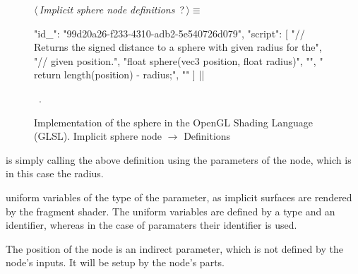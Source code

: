 \documentclass[%
    a4paper,    %
    justified,  %
    nobib,      %
    openany     %
]{tufte-book}
\makeatletter
\renewcommand{\label}[1]{\@tufte@label{##1}}%
\makeatother
\begin{document}
\begin{figure}
\begin{flushleft} \small
\begin{minipage}{\linewidth}\label{scrap102}\raggedright\small
{} $\langle\,${\itshape Implicit sphere node definitions}\nobreak\ {\footnotesize {?}}$\,\rangle\equiv$
\vspace{-1ex}
\begin{pythoncode}
{
    "id_": "99d20a26-f233-4310-adb2-5e540726d079",
    "script": [
        "// Returns the signed distance to a sphere with given radius for the",
        "// given position.",
        "float sphere(vec3 position, float radius)",
        "{",
        "    return length(position) - radius;",
        "}"
    ]
}|\NWsep|
\end{pythoncode}
\vspace{1.5ex}
\footnotesize
\begin{list}{}{\setlength{\itemsep}{-\parsep}\setlength{\itemindent}{-\leftmargin}}
\item \NWtxtMacroRefIn\ .

\item{}
\end{list}
\end{minipage}\vspace{4ex}
\end{flushleft}
\caption{Implementation of the sphere in the OpenGL Shading Language (GLSL).
  \newline{}\newline{}Implicit sphere node $\rightarrow$ Definitions}
\label{editor:lst:nodes:sphere-node:definition}
\end{figure}

 is simply calling the above definition
using the parameters of the node, which is in this case the radius.

 uniform variables
of the type of the parameter, as implicit surfaces are rendered by the fragment
shader. The uniform variables are defined by a type and an identifier, whereas
in the case of paramaters their identifier is used.

The position of the node is an indirect parameter, which is not defined by the
node's inputs. It will be setup by the node's parts.
\end{document}
